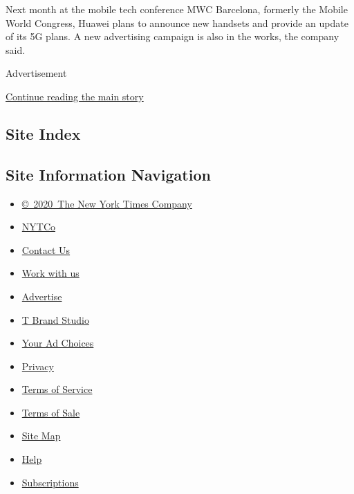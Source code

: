 Next month at the mobile tech conference MWC Barcelona, formerly the
Mobile World Congress, Huawei plans to announce new handsets and provide
an update of its 5G plans. A new advertising campaign is also in the
works, the company said.

Advertisement

\protect\hyperlink{after-bottom}{Continue reading the main story}

\hypertarget{site-index}{%
\subsection{Site Index}\label{site-index}}

\hypertarget{site-information-navigation}{%
\subsection{Site Information
Navigation}\label{site-information-navigation}}

\begin{itemize}
\tightlist
\item
  \href{https://help.nytimes.com/hc/en-us/articles/115014792127-Copyright-notice}{©~2020~The
  New York Times Company}
\end{itemize}

\begin{itemize}
\tightlist
\item
  \href{https://www.nytco.com/}{NYTCo}
\item
  \href{https://help.nytimes.com/hc/en-us/articles/115015385887-Contact-Us}{Contact
  Us}
\item
  \href{https://www.nytco.com/careers/}{Work with us}
\item
  \href{https://nytmediakit.com/}{Advertise}
\item
  \href{http://www.tbrandstudio.com/}{T Brand Studio}
\item
  \href{https://www.nytimes.com/privacy/cookie-policy\#how-do-i-manage-trackers}{Your
  Ad Choices}
\item
  \href{https://www.nytimes.com/privacy}{Privacy}
\item
  \href{https://help.nytimes.com/hc/en-us/articles/115014893428-Terms-of-service}{Terms
  of Service}
\item
  \href{https://help.nytimes.com/hc/en-us/articles/115014893968-Terms-of-sale}{Terms
  of Sale}
\item
  \href{https://spiderbites.nytimes.com}{Site Map}
\item
  \href{https://help.nytimes.com/hc/en-us}{Help}
\item
  \href{https://www.nytimes.com/subscription?campaignId=37WXW}{Subscriptions}
\end{itemize}
